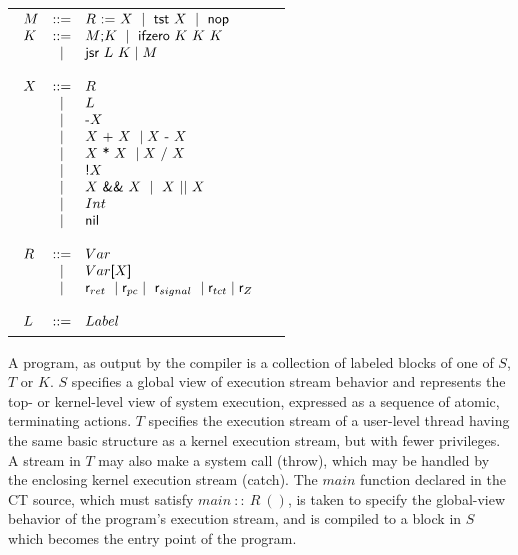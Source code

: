 \documentclass{article}
\newcommand{\throw}[0]{\textsf{throw}}
\newcommand{\catch}[0]{\textsf{catch}}
\newcommand{\ifz}[0]{\textsf{ifzero}}
\newcommand{\jsr}[0]{\textsf{jsr}}
\begin{document}
\begin{tabular}{cc}
{
\begin{minipage}[t]{2.15in}
$
\begin{array}[t]{lcl}
  M &::=& R \ \textsf{:=} \ X\ \mid \ \textsf{tst} \ X\ \mid \  \textsf{nop}\\
  K &::=& M\textsf{;}K \ \mid \ \ifz \ K \ K \ K \\
      &\mid& \jsr \ L \ K \mid M\\
\\
X &::=& R\\
  & \mid & L\\
  & \mid & \textsf{-}X\\
  & \mid & X \ \textsf{+} \ X \ \mid X \ \textsf{-} \ X\\
  & \mid & X \ \textsf{*} \ X \ \mid X \ \textsf{/} \ X\\
  & \mid & \textsf{!}X\\
  & \mid & X \ \textsf{\&\&} \ X \ \mid \ X \ \textsf{$\mid \mid$} \ X\\
  & \mid & Int\\
  & \mid & \textsf{nil}\\
  \\
R &::=& Var\\
  & \mid & Var \textsf{[}X\textsf{]}\\
  & \mid & \textsf{r$_{ret}$}\ \mid  \textsf{r$_{pc}$}
  \mid \  \textsf{r$_{signal}$}\  \mid  \textsf{r$_{tct}$} \mid  \textsf{r$_{Z}$}\\
  \\
  L &::=& Label\\
\end{array}
$
\end{minipage}
}
\\
\end{tabular}

A program, as output by the compiler is a collection of labeled blocks of one of $S$, $T$ or $K$.  $S$ specifies a global view of execution stream behavior and represents the top- or kernel-level view of system execution, expressed as a sequence of atomic, terminating actions.  $T$ specifies the execution stream of a user-level thread having the same basic structure as a kernel execution stream, but with fewer privileges.  A stream in $T$ may also make a system call (\throw), which may be handled by the enclosing kernel execution stream (\catch).  The $main$ function declared in the CT source, which must satisfy $main \ :: \ R \ ()$, is taken to specify the global-view behavior of the program's execution stream, and is compiled to a block in $S$ which becomes the entry point of the program.
\end{document}
